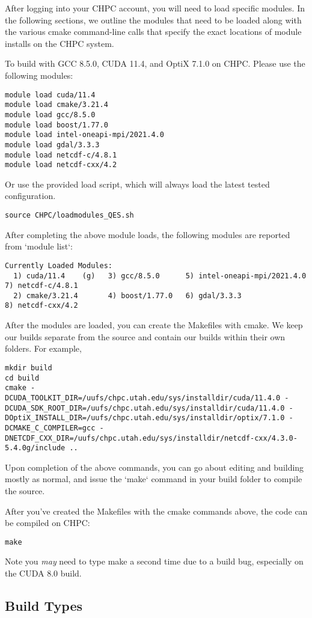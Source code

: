 After logging into your CHPC account, you will need to load specific modules. In the following sections, we outline the modules that need to be loaded along with the various cmake command-line calls that specify the exact locations of module installs on the CHPC system.

To build with GCC 8.5.0, CUDA 11.4, and OptiX 7.1.0 on CHPC. Please use the following modules:
\begin{verbatim}
module load cuda/11.4
module load cmake/3.21.4
module load gcc/8.5.0
module load boost/1.77.0
module load intel-oneapi-mpi/2021.4.0
module load gdal/3.3.3
module load netcdf-c/4.8.1
module load netcdf-cxx/4.2
\end{verbatim}
Or use the provided load script, which will always load the latest tested configuration.
\begin{verbatim}
source CHPC/loadmodules_QES.sh
\end{verbatim}
After completing the above module loads, the following modules are reported from `module list`:
\begin{verbatim}
Currently Loaded Modules:
  1) cuda/11.4    (g)   3) gcc/8.5.0      5) intel-oneapi-mpi/2021.4.0   7) netcdf-c/4.8.1
  2) cmake/3.21.4       4) boost/1.77.0   6) gdal/3.3.3                  8) netcdf-cxx/4.2
\end{verbatim}
After the modules are loaded, you can create the Makefiles with cmake.  We keep our builds separate from the source and contain our builds within their own folders.  For example,
\begin{verbatim}
mkdir build
cd build
cmake -DCUDA_TOOLKIT_DIR=/uufs/chpc.utah.edu/sys/installdir/cuda/11.4.0 -DCUDA_SDK_ROOT_DIR=/uufs/chpc.utah.edu/sys/installdir/cuda/11.4.0 -DOptiX_INSTALL_DIR=/uufs/chpc.utah.edu/sys/installdir/optix/7.1.0 -DCMAKE_C_COMPILER=gcc -DNETCDF_CXX_DIR=/uufs/chpc.utah.edu/sys/installdir/netcdf-cxx/4.3.0-5.4.0g/include ..
\end{verbatim}
Upon completion of the above commands, you can go about editing and building mostly as normal, and issue the `make` command in your build folder to compile the source.

After you've created the Makefiles with the cmake commands above, the code can be compiled on CHPC:
\begin{verbatim}
make
\end{verbatim}
Note you \textit{may} need to type make a second time due to a build bug, especially on the CUDA 8.0 build.

\subsection{Build Types}

